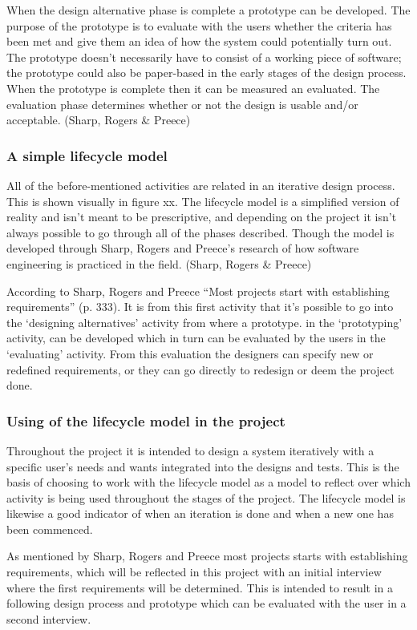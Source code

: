 When the design alternative phase is complete a prototype can be developed. The purpose of the prototype is to evaluate with the users whether the criteria has been met and give them an idea of how the system could potentially turn out. The prototype doesn’t necessarily have to consist of a working piece of software; the prototype could also be paper-based in the early stages of the design process. When the prototype is complete then it can be measured an evaluated. The evaluation phase determines whether or not the design is usable and/or acceptable. (Sharp, Rogers \& Preece)

\subsubsection{A simple lifecycle model}
All of the before-mentioned activities are related in an iterative design process. This is shown visually in figure xx. The lifecycle model is a simplified version of reality and isn’t meant to be prescriptive, and depending on the project it isn’t always possible to go through all of the phases described. Though the model is developed through Sharp, Rogers and Preece’s research of how software engineering is practiced in the field. (Sharp, Rogers \& Preece)

According to Sharp, Rogers and Preece “Most projects start with establishing requirements” (p. 333). It is from this first activity that it’s possible to go into the ‘designing alternatives’ activity from where a prototype. in the ‘prototyping’ activity, can be developed which in turn can be evaluated by the users in the ‘evaluating’ activity. From this evaluation the designers can specify new or redefined requirements, or they can go directly to redesign or deem the project done.

\subsubsection{Using of the lifecycle model in the project}
Throughout the project it is intended to design a system iteratively with a specific user’s needs and wants integrated into the designs and tests. This is the basis of choosing to work with the lifecycle model as a model to reflect over which activity is being used throughout the stages of the project. The lifecycle model is likewise a good indicator of when an iteration is done and when a new one has been commenced. 

As mentioned by Sharp, Rogers and Preece most projects starts with establishing requirements, which will be reflected in this project with an initial interview where the first requirements will be determined. This is intended to result in a following design process and prototype which can be evaluated with the user in a second interview.